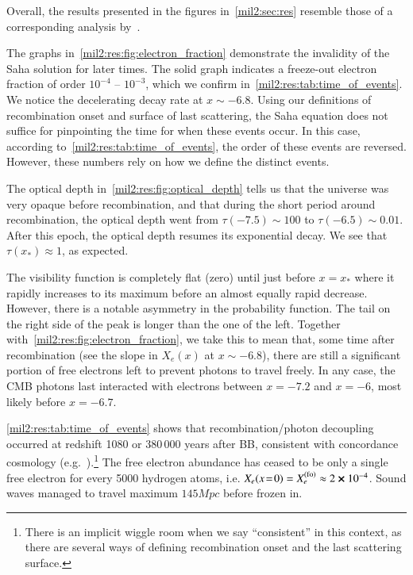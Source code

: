 



Overall, the results presented in the figures in~\cref{mil2:sec:res} resemble those of a corresponding analysis by~\citet[see][Fig.~1,~2]{Callin2006}.


The graphs in~\cref{mil2:res:fig:electron_fraction} demonstrate the invalidity of the Saha solution for later times. The solid graph indicates a freeze-out electron fraction of order $10^{-4}$ -- $10^{-3}$, which we confirm in~\cref{mil2:res:tab:time_of_events}. We notice the decelerating decay rate at $x\sim -6.8$. Using our definitions of recombination onset and surface of last scattering, the Saha equation does not suffice for pinpointing the time for when these events occur. In this case, according to~\cref{mil2:res:tab:time_of_events}, the order of these events are reversed. However, these numbers rely on how we define the distinct events.

The optical depth in~\cref{mil2:res:fig:optical_depth} tells us that the universe was very opaque before recombination, and that during the short period around recombination, the optical depth went from $\tau(-7.5)\sim 100$ to $\tau( -6.5)\sim 0.01$. After this epoch, the optical depth resumes its exponential decay. We see that $\tau(x_*)\approx 1$, as expected. 


The visibility function is completely flat (zero) until just before $x=x_*$ where it rapidly increases to its maximum before an almost equally rapid decrease. However, there is a notable asymmetry in the probability function. The tail on the right side of the peak is longer than the one of the left. Together with~\cref{mil2:res:fig:electron_fraction}, we take this to mean that, some time after recombination (see the slope in $X_e(x)$ at $x\sim -6.8$), there are still a significant portion of free electrons left to prevent photons to travel freely. In any case, the CMB photons last interacted with electrons between $x=-7.2$ and $x=-6$, most likely before $x=-6.7$.

\cref{mil2:res:tab:time_of_events} shows that recombination/photon decoupling occurred at redshift 1080 or 380\,000 years after BB, consistent with concordance cosmology (e.g.~\citet[Tab.~3.1]{Baumann}).\footnote{There is an implicit wiggle room when we say ``consistent'' in this context, as there are several ways of defining recombination onset and the last scattering surface.} The free electron abundance has ceased to be only a single free electron for every 5000 hydrogen atoms, i.e. $X_e(x\!=\!0) = X_e^\mathrm{(fo)}\approx 2\cross 10^{-4}$. Sound waves managed to travel maximum $145\unit{Mpc}$ before frozen in.



